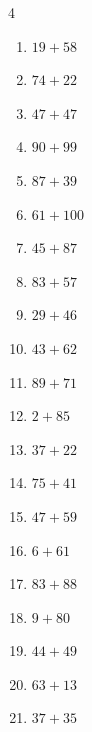 \begin{multicols}{4}
\begin{enumerate}
  \item $19+58$
        \phantom{$=77$}

  \item $74+22$
        \phantom{$=96$}

  \item $47+47$
        \phantom{$=94$}

  \item $90+99$
        \phantom{$=189$}

\columnbreak %

\resetques

  \item $87+39$
        \phantom{$=126$}

  \item $61+100$
        \phantom{$=161$}

  \item $45+87$
        \phantom{$=132$}

  \item $83+57$
        \phantom{$=140$}

  \item $29+46$
        \phantom{$=75$}

  \item $43+62$
        \phantom{$=105$}

  \item $89+71$
        \phantom{$=160$}

  \item $2+85$
        \phantom{$=87$}

  \item $37+22$
        \phantom{$=59$}

  \item $75+41$
        \phantom{$=116$}

  \item $47+59$
        \phantom{$=106$}

  \item $6+61$
        \phantom{$=67$}

  \item $83+88$
        \phantom{$=171$}

  \item $9+80$
        \phantom{$=89$}

  \item $44+49$
        \phantom{$=93$}

  \item $63+13$
        \phantom{$=76$}

  \item $37+35$
        \phantom{$=72$}


\end{enumerate}
\end{multicols}
